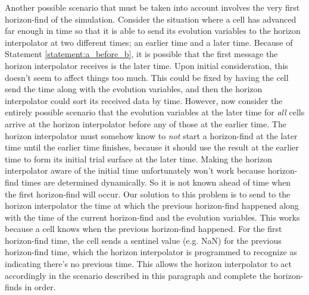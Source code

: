 \begin{bibunit}[unsrtnat]
Another possible scenario that must be taken into account involves the very
first horizon-find of the simulation. Consider the situation where a cell has
advanced far enough in time so that it is able to send its evolution variables
to the horizon interpolator at two different times; an earlier time and a later
time. Because of Statement \ref{statement:a_before_b}, it is possible that the
first message the horizon interpolator receives is the later time. Upon initial
consideration, this doesn't seem to affect things too much. This could be fixed
by having the cell send the time along with the evolution variables, and then
the horizon interpolator could sort its received data by time. However, now
consider the entirely possible scenario that the evolution variables at the
later time for \textit{all} cells arrive at the horizon interpolator before any
of those at the earlier time. The horizon interpolator must somehow know to
\textit{not} start a horizon-find at the later time until the earlier time
finishes, because it should use the result at the earlier time to form its
initial trial surface at the later time.
Making the horizon interpolator aware of the initial time
unfortunately won't work because horizon-find times are determined dynamically.
So it is not known ahead of time when the first horizon-find will occur. Our
solution to this problem is to send to the horizon interpolator the time at
which the previous horizon-find happened along with the time of the current
horizon-find and the evolution variables. This works because a cell knows when
the previous horizon-find happened. For the first horizon-find time, the cell
sends a sentinel value (e.g. NaN) for the previous horizon-find time, which the
horizon interpolator is programmed to recognize as indicating there's no
previous time. This allows the horizon interpolator to act accordingly in the
scenario described in this paragraph and complete the horizon-finds in order.



\end{bibunit}
